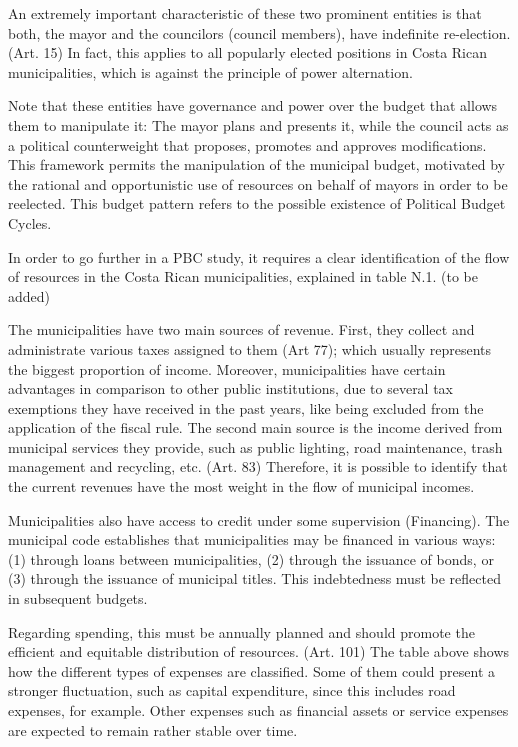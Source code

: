 An extremely important characteristic of these two prominent entities is that both, the mayor and the councilors (council members), have indefinite re-election. (Art. 15) In fact, this applies to all popularly elected positions in Costa Rican municipalities, which is against the principle of power alternation. 

Note that these entities have governance and power over the budget that allows them to manipulate it: The mayor plans and presents it, while the council acts as a political counterweight that proposes, promotes and approves modifications. This framework permits the manipulation of the municipal budget, motivated by the rational and opportunistic use of resources on behalf of mayors in order to be reelected. This budget pattern refers to the possible existence of Political Budget Cycles.

In order to go further in a PBC study, it requires a clear identification of the flow of resources in the Costa Rican municipalities, explained in table N.1. (to be added)

The municipalities have two main sources of revenue. First, they collect and administrate various taxes assigned to them (Art 77); which usually represents the biggest proportion of income. Moreover, municipalities have certain advantages in comparison to other public institutions, due to several tax exemptions they have received in the past years, like being excluded from the application of the fiscal rule. The second main source is the income derived from municipal services they provide, such as public lighting, road maintenance, trash management and recycling, etc. (Art. 83) Therefore, it is possible to identify that the current revenues have the most weight in the flow of municipal incomes.

Municipalities also have access to credit under some supervision (Financing). The municipal code establishes that municipalities may be financed in various ways: (1) through loans between municipalities, (2) through the issuance of bonds, or (3) through the issuance of municipal titles. This indebtedness must be reflected in subsequent budgets.

Regarding spending, this must be annually planned and should promote the efficient and equitable distribution of resources. (Art. 101) The table above shows how the different types of expenses are classified. Some of them could present a stronger fluctuation, such as capital expenditure, since this includes road expenses, for example. Other expenses such as financial assets or service expenses are expected to remain rather stable over time.

